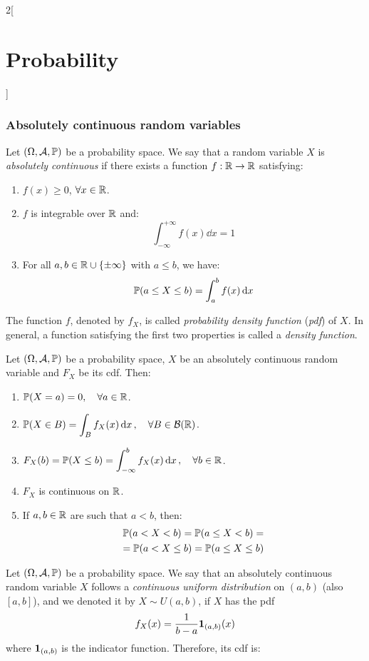 \documentclass[../../../main_math.tex]{subfiles}
\begin{document}
\begin{multicols}{2}[\section{Probability}]
  \subsubsection{Absolutely continuous random variables}
  \begin{definition}
    Let $(\Omega,\mathcal{A},\mathbb{P})$ be a probability space. We say that a random variable $X$ is \emph{absolutely continuous} if there exists a function $f:\mathbb{R}\rightarrow\mathbb{R}$ satisfying:
    \begin{enumerate}
      \item $f(x)\geq 0$, $\forall x\in\mathbb{R}$.
      \item $f$ is integrable over $\mathbb{R}$ and: $$\int_{-\infty}^{+\infty}f(x)\dd{x}=1$$
      \item For all $a,b\in\mathbb{R}\cup\{\pm\infty\}$ with $a\leq b$, we have: $$\mathbb{P}(a\leq X\leq b)=\int_a^bf(x)\dd{x}$$
    \end{enumerate}
    The function $f$, denoted by $f_X$, is called \emph{probability density function} (\emph{pdf}) of $X$. In general, a function satisfying the first two properties is called a \emph{density function}.
  \end{definition}
  \begin{proposition}
    Let $(\Omega,\mathcal{A},\mathbb{P})$ be a probability space, $X$ be an absolutely continuous random variable and $F_X$ be its cdf. Then:
    \begin{enumerate}
      \item $\mathbb{P}(X=a)=0,\quad\forall a\in \mathbb{R}$.
      \item $\displaystyle \mathbb{P}(X\in B)=\int_Bf_X(x)\dd{x},\quad\forall B\in\mathcal{B}(\mathbb{R})$.
      \item $\displaystyle F_X(b)=\mathbb{P}(X\leq b)=\int_{-\infty}^bf_X(x)\dd{x},\quad\forall b\in\mathbb{R}$.
      \item $F_X$ is continuous on $\mathbb{R}$.
      \item If $a,b\in\mathbb{R}$ are such that $a<b$, then:
            \begin{multline*}
              \mathbb{P}(a<X<b)=\mathbb{P}(a\leq X<b)=\\=\mathbb{P}(a<X\leq b)=\mathbb{P}(a\leq X\leq b)
            \end{multline*}
    \end{enumerate}
  \end{proposition}
  \begin{definition}
    Let $(\Omega,\mathcal{A},\mathbb{P})$ be a probability space. We say that an absolutely continuous random variable $X$ follows a \emph{continuous uniform distribution} on $(a,b)$ (also $[a,b]$), and we denoted it by $X\sim U(a,b)$, if $X$ has the pdf $$f_X(x)=\frac{1}{b-a}\boldsymbol{\mathrm{1}}_{(a,b)}(x)$$ where $\boldsymbol{\mathrm{1}}_{(a,b)}$ is the indicator function. Therefore, its cdf is:

\end{definition}
\end{multicols}
\end{document}
